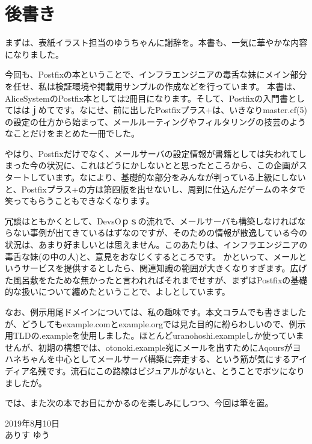\section*{後書き}

まずは、表紙イラスト担当のゆうちゃんに謝辞を。本書も、一気に華やかな内容になりました。

今回も、Postfixの本ということで、インフラエンジニアの毒舌な妹にメイン部分を任せ、私は検証環境や掲載用サンプルの作成などを行っています。
本書は、AliceSystemのPostfix本としては2冊目になります。そして、Postfixの入門書としてははｊめてです。なにせ、前に出したPostfixプラス+は、いきなりmaster.cf(5)の設定の仕方から始まって、メールルーティングやフィルタリングの技芸のようなことだけをまとめた一冊でした。

やはり、Postfixだけでなく、メールサーバの設定情報が書籍としては失われてしまった今の状況に、これはどうにかしないとと思ったところから、この企画がスタートしています。なにより、基礎的な部分をみんなが判っている上級にしないと、Postfixプラス+の方は第四版を出せないし、周到に仕込んだゲームのネタで笑ってもらうこともできなくなります。

冗談はともかくとして、DevsOｐｓの流れで、メールサーバも構築しなければならない事例が出てきているはずなのですが、そのための情報が散逸している今の状況は、あまり好ましいとは思えません。このあたりは、インフラエンジニアの毒舌な妹(の中の人)と、意見をおなじくするところです。
かといって、メールというサービスを提供するとしたら、関連知識の範囲が大きくなりすぎます。広げた風呂敷をたためな無かったと言われればそれまでせすが、まずはPostfixの基礎的な扱いについて纏めたということで、よしとしています。

なお、例示用尾ドメインについては、私の趣味です。本文コラムでも書きましたが、どうしてもexample.comとexample.orgでは見た目的に紛らわしいので、例示用TLDの.exampleを使用しました。ほとんどuranohoshi.exampleしか使っていませんが、初期の構想では、otonoki.example宛にメールを出すためにAqoursがヨハネちゃんを中心としてメールサーバ構築に奔走する、という筋が気にするアイディア名残です。流石にこの路線はビジュアルがないと、とうことでボツになりましたが。

では、また次の本でお目にかかるのを楽しみにしつつ、今回は筆を置。

\begin{flushright}
2019年8月10日 \\
ありす ゆう
\end{flushright}





